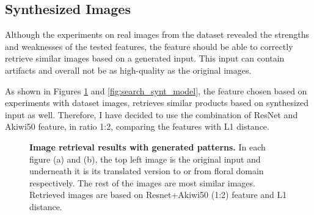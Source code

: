 \documentclass[12pt]{report}
\begin{document}
\subsection{Synthesized Images}
Although the experiments on real images from the dataset revealed the strengths and weaknesses of the tested features, the feature should be able to correctly retrieve similar images based on a generated input. This input can contain artifacts and overall not be as high-quality as the original images. 

As shown in Figures \ref{fig:search_synt_pattern} and \ref{fig:search_synt_model}, the feature chosen based on experiments with dataset images, retrieves similar products based on synthesized input as well. Therefore, I have decided to use the combination of ResNet and Akiwi50 feature, in ratio 1:2, comparing the features with L1 distance.

\begin{figure}[h]
\centering
{}\vspace{0.3cm}
\caption{\label{fig:search_synt_pattern} \textbf{Image retrieval results with generated patterns.} In each figure (a) and (b), the top left image is the original input and underneath it is its translated version to or from floral domain respectively. The rest of the images are most similar images. Retrieved images are based on Resnet+Akiwi50 (1:2) feature and L1 distance.}
\end{figure}
\end{document}
